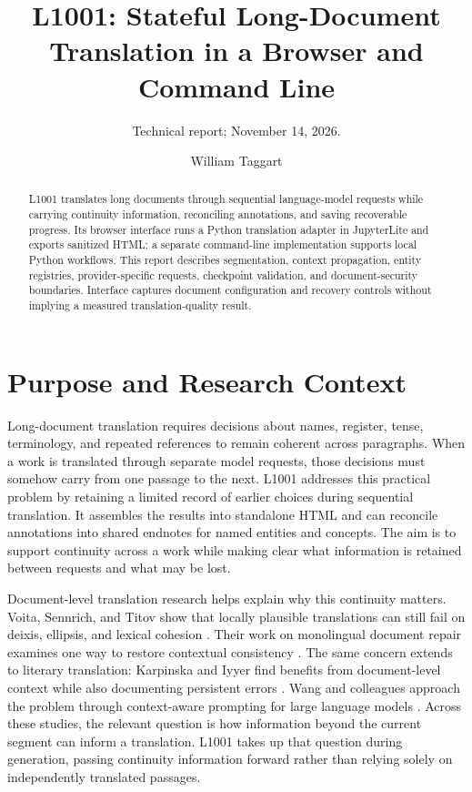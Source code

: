 \documentclass[manuscript,screen,nonacm]{acmart}
\title{L1001: Stateful Long-Document Translation in a Browser and Command Line}
\subtitle{Technical report; November 14, 2026.}
\author{William Taggart}
\affiliation{\department{Modern and Classical Languages and Literatures}\institution{Virginia Tech}\city{Blacksburg}\state{Virginia}\country{USA}}
\begin{document}
\begin{abstract}
L1001 translates long documents through sequential language-model requests while carrying continuity information, reconciling annotations, and saving recoverable progress. Its browser interface runs a Python translation adapter in JupyterLite and exports sanitized HTML; a separate command-line implementation supports local Python workflows. This report describes segmentation, context propagation, entity registries, provider-specific requests, checkpoint validation, and document-security boundaries. Interface captures document configuration and recovery controls without implying a measured translation-quality result.
\end{abstract}
\maketitle
\section{Purpose and Research Context}

Long-document translation requires decisions about names, register, tense, terminology, and repeated references to remain coherent across paragraphs. When a work is translated through separate model requests, those decisions must somehow carry from one passage to the next. L1001 addresses this practical problem by retaining a limited record of earlier choices during sequential translation. It assembles the results into standalone HTML and can reconcile annotations into shared endnotes for named entities and concepts. The aim is to support continuity across a work while making clear what information is retained between requests and what may be lost.

Document-level translation research helps explain why this continuity matters. Voita, Sennrich, and Titov show that locally plausible translations can still fail on deixis, ellipsis, and lexical cohesion \cite{context}. Their work on monolingual document repair examines one way to restore contextual consistency \cite{docrepair}. The same concern extends to literary translation: Karpinska and Iyyer find benefits from document-level context while also documenting persistent errors \cite{literary}. Wang and colleagues approach the problem through context-aware prompting for large language models \cite{docmt}. Across these studies, the relevant question is how information beyond the current segment can inform a translation. L1001 takes up that question during generation, passing continuity information forward rather than relying solely on independently translated passages.
\end{document}
